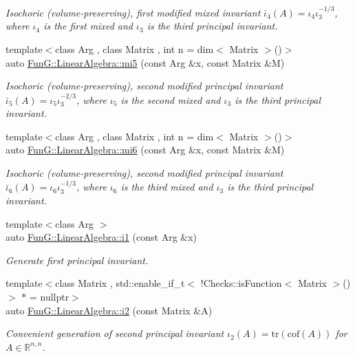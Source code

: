 \begin{DoxyCompactItemize}
\begin{DoxyCompactList}\small\item\em Isochoric (volume-\/preserving), first modified mixed invariant $ \bar\iota_4(A)=\iota_4\iota_3^{-1/3} $, where $\iota_4$ is the first mixed and $\iota_3$ is the third principal invariant. \end{DoxyCompactList}\item 
{\footnotesize template$<$class Arg , class Matrix , int n = dim$<$ Matrix $>$()$>$ }\\auto \hyperlink{group__InvariantGroup_ga189bc682b34d13902da335c5eb502faa}{Fun\+G\+::\+Linear\+Algebra\+::mi5} (const Arg \&x, const Matrix \&M)
\begin{DoxyCompactList}\small\item\em Isochoric (volume-\/preserving), second modified principal invariant $ \bar\iota_5(A)=\iota_5\iota_3^{-2/3} $, where $\iota_5$ is the second mixed and $\iota_3$ is the third principal invariant. \end{DoxyCompactList}\item 
{\footnotesize template$<$class Arg , class Matrix , int n = dim$<$ Matrix $>$()$>$ }\\auto \hyperlink{group__InvariantGroup_ga3e451f9e15fa95080f81d0c0f69f93e6}{Fun\+G\+::\+Linear\+Algebra\+::mi6} (const Arg \&x, const Matrix \&M)
\begin{DoxyCompactList}\small\item\em Isochoric (volume-\/preserving), second modified principal invariant $ \bar\iota_6(A)=\iota_6\iota_3^{-1/3} $, where $\iota_6$ is the third mixed and $\iota_3$ is the third principal invariant. \end{DoxyCompactList}\item 
{\footnotesize template$<$class Arg $>$ }\\auto \hyperlink{group__InvariantGroup_gafaead59b618d87239270f8eca2bf75c8}{Fun\+G\+::\+Linear\+Algebra\+::i1} (const Arg \&x)
\begin{DoxyCompactList}\small\item\em Generate first principal invariant. \end{DoxyCompactList}\item 
{\footnotesize template$<$class Matrix , std\+::enable\+\_\+if\+\_\+t$<$ !\+Checks\+::is\+Function$<$ Matrix $>$() $>$ $\ast$  = nullptr$>$ }\\auto \hyperlink{group__InvariantGroup_ga9e442bab8f203bcd5634a3d0e65bf802}{Fun\+G\+::\+Linear\+Algebra\+::i2} (const Matrix \&A)
\begin{DoxyCompactList}\small\item\em Convenient generation of second principal invariant $ \iota_2(A)=\mathrm{tr}(\mathrm{cof}(A)) $ for $A\in\mathbb{R}^{n,n}$. \end{DoxyCompactList}\item 

\end{DoxyCompactItemize}
